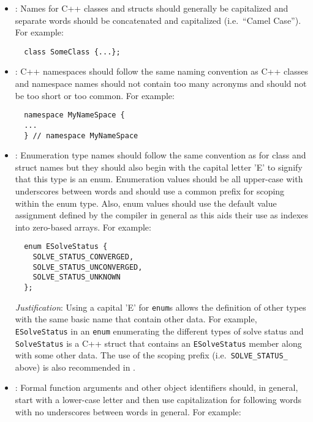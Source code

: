 \begin{itemize}


{}\item\NCClassNames: Names for C++ classes and structs should
generally be capitalized and separate words should be concatenated and
capitalized (i.e.\ ``Camel Case'').  For example:

{\small\begin{verbatim}
  class SomeClass {...};
\end{verbatim}}


{}\item\NCNamespaceNames: C++ namespaces should follow the same naming
convention as C++ classes and namespace names should not contain too many
acronyms and should not be too short or too common.  For example:

{\small\begin{verbatim}
  namespace MyNameSpace {
  ...
  } // namespace MyNameSpace 
\end{verbatim}}


{}\item\NCEnumNames: Enumeration type names should follow the same convention
as for class and struct names but they should also begin with the capital
letter 'E' to signify that this type is an enum.  Enumeration values should be
all upper-case with underscores between words and should use a common prefix
for scoping within the enum type.  Also, enum values should use the default
value assignment defined by the compiler in general as this aids their use as
indexes into zero-based arrays.  For example:

{\small\begin{verbatim}
  enum ESolveStatus {
    SOLVE_STATUS_CONVERGED,
    SOLVE_STATUS_UNCONVERGED,
    SOLVE_STATUS_UNKNOWN
  };
\end{verbatim}}


{}\textit{Justification}: Using a capital 'E' for {}\texttt{enum}s allows the
definition of other types with the same basic name that contain other data.
For example, {}\texttt{ESolveStatus} in an {}\texttt{enum} enumerating the
different types of solve status and {}\texttt{SolveStatus} is a C++ struct
that contains an {}\texttt{ESolveStatus} member along with some other data.
The use of the scoping prefix (i.e.\ {}\texttt{SOLVE\-\_STATUS\_} above) is
also recommended in {}\cite[Section 11.4]{CodeComplete2nd04}.


{}\item\NCObjectNames: Formal function arguments and other object identifiers
should, in general, start with a lower-case letter and then use capitalization
for following words with no underscores between words in general.  For
example:


\end{itemize}
